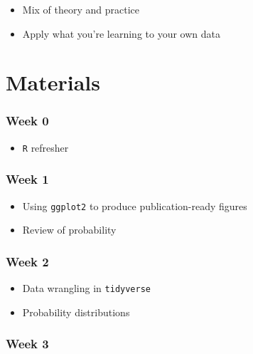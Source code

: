 \documentclass[
  letterpaper,
  DIV=11,
  numbers=noendperiod]{scrreprt}
\providecommand{\tightlist}{%
  \setlength{\itemsep}{0pt}\setlength{\parskip}{0pt}}\usepackage{longtable,booktabs,array}
\begin{document}

\begin{itemize}
\tightlist
\item
  Mix of theory and practice
\item
  Apply what you're learning to your own data
\end{itemize}

\section*{Materials}\label{materials}


\subsubsection*{Week 0}\label{week-0}

\begin{itemize}
\tightlist
\item
  \texttt{R} refresher
\end{itemize}

\subsubsection*{Week 1}\label{week-1}

\begin{itemize}
\tightlist
\item
  Using \texttt{ggplot2} to produce publication-ready figures
\item
  Review of probability
\end{itemize}

\subsubsection*{Week 2}\label{week-2}

\begin{itemize}
\tightlist
\item
  Data wrangling in \texttt{tidyverse}
\item
  Probability distributions
\end{itemize}

\subsubsection*{Week 3}\label{week-3}
\end{document}
